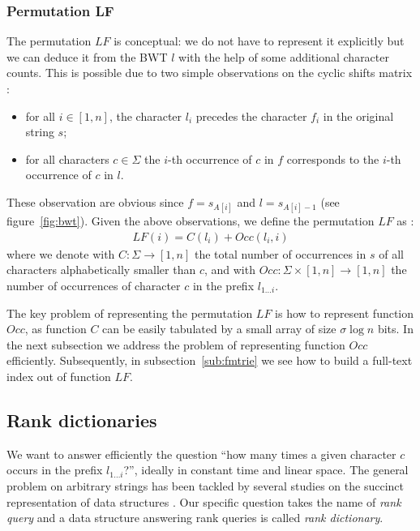 \subsubsection{Permutation LF}

The permutation $LF$ is conceptual: we do not have to represent it explicitly but we can deduce it from the BWT $l$ with the help of some additional character counts.
This is possible due to two simple observations on the cyclic shifts matrix \citep{Burrows1994}:
\begin{itemize}
\item for all $i \in [1,n]$, the character $l_i$ precedes the character $f_i$ in the original string $s$;%
\item for all characters $c \in \Sigma$ the $i$-th occurrence of $c$ in $f$ corresponds to the $i$-th occurrence of $c$ in $l$.
\end{itemize}
These observation are obvious since $f = s_{A[i]}$ and $l = s_{A[i] - 1}$ (see figure~\ref{fig:bwt}).
Given the above observations, we define the permutation $LF$ as \citep{Burrows1994,Ferragina2000}:
\begin{eqnarray}
LF(i) = C(l_i) + Occ(l_i, i)
\end{eqnarray}
where we denote with $C : \Sigma \rightarrow [1,n]$ the total number of occurrences in $s$ of all characters alphabetically smaller than $c$, and with $Occ :  \Sigma \times [1,n] \rightarrow [1,n]$ the number of occurrences of character $c$ in the prefix $l_{1 \dots i}$.

The key problem of representing the permutation $LF$ is how to represent function $Occ$, as function $C$ can be easily tabulated by a small array of size $\sigma \log{n}$ bits.
In the next subsection we address the problem of representing function $Occ$ efficiently. Subsequently, in subsection~\ref{sub:fmtrie} we see how to build a full-text index out of function $LF$.

\subsection{Rank dictionaries}

We want to answer efficiently the question ``how many times a given character $c$ occurs in the prefix $l_{1 \dots i}$?'', ideally in constant time and linear space.
The general problem on arbitrary strings has been tackled by several studies on the succinct representation of data structures \citep{Jacobson1989}.
Our specific question takes the name of \emph{rank query} and a data structure answering rank queries is called \emph{rank dictionary}.

